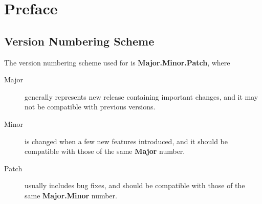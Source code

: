 \chapter{Preface}
\label{chapter-preface}

\section{Version Numbering Scheme}

The version numbering scheme used for \LibName is \textbf{Major.Minor.Patch},
where
\begin{description}
  \item[Major] generally represents new release containing important changes,
    and it may not be compatible with previous versions.
  \item[Minor] is changed when a few new features introduced, and it should be
    compatible with those of the same \textbf{Major} number.
  \item[Patch] usually includes bug fixes, and should be compatible with those
    of the same \textbf{Major.Minor} number.
\end{description}

